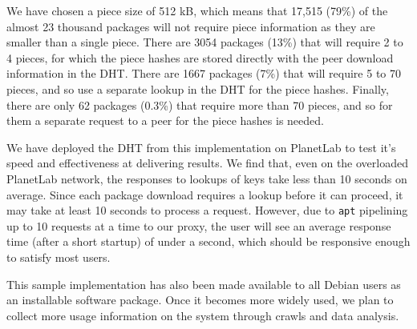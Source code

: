 \documentclass[conference]{IEEEtran}
\begin{document}
We have chosen a piece size of 512 kB, which means that 17,515
(79\%) of the almost 23 thousand packages will not require piece
information as they are smaller than a single piece. There are 3054
packages (13\%) that will require 2 to 4 pieces, for which the piece
hashes are stored directly with the peer download information in the
DHT. There are 1667 packages (7\%) that will require 5 to 70 pieces,
and so use a separate lookup in the DHT for the piece hashes.
Finally, there are only 62 packages (0.3\%) that require more than
70 pieces, and so for them a separate request to a peer for the
piece hashes is needed.

We have deployed the DHT from this implementation on PlanetLab to
test it's speed and effectiveness at delivering results. We find
that, even on the overloaded PlanetLab network, the responses to
lookups of keys take less than 10 seconds on average. Since each
package download requires a lookup before it can proceed, it may
take at least 10 seconds to process a request. However, due to
\texttt{apt} pipelining up to 10 requests at a time to our proxy,
the user will see an average response time (after a short startup)
of under a second, which should be responsive enough to satisfy most
users.

This sample implementation has also been made available to all
Debian users as an installable software package. Once it becomes
more widely used, we plan to collect more usage information on the
system through crawls and data analysis.



\end{document}
